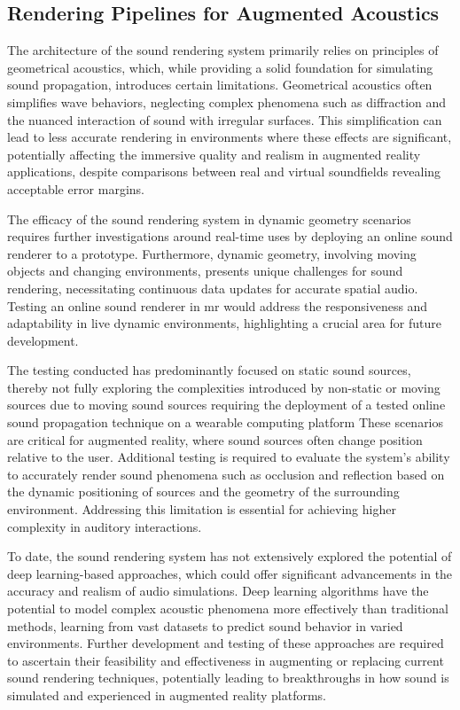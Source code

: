 \subsection{Rendering Pipelines for Augmented Acoustics}
The architecture of the sound rendering system primarily relies on principles of geometrical acoustics, which, while providing a solid foundation for simulating sound propagation, introduces certain limitations. Geometrical acoustics often simplifies wave behaviors, neglecting complex phenomena such as diffraction and the nuanced interaction of sound with irregular surfaces. This simplification can lead to less accurate rendering in environments where these effects are significant, potentially affecting the immersive quality and realism in augmented reality applications, despite comparisons between real and virtual soundfields revealing acceptable error margins.\par
The efficacy of the sound rendering system in dynamic geometry scenarios requires further investigations around real-time uses by deploying an online sound renderer to a prototype. Furthermore, dynamic geometry, involving moving objects and changing environments, presents unique challenges for sound rendering, necessitating continuous data updates for accurate spatial audio. Testing an online sound renderer in \acrshort{mr} would address the responsiveness and adaptability in live dynamic environments, highlighting a crucial area for future development.\par
The testing conducted has predominantly focused on static sound sources, thereby not fully exploring the complexities introduced by non-static or moving sources due to moving sound sources requiring the deployment of a tested online sound propagation technique on a wearable computing platform These scenarios are critical for augmented reality, where sound sources often change position relative to the user. Additional testing is required to evaluate the system's ability to accurately render sound phenomena such as occlusion and reflection based on the dynamic positioning of sources and the geometry of the surrounding environment. Addressing this limitation is essential for achieving higher complexity in auditory interactions.\par
To date, the sound rendering system has not extensively explored the potential of deep learning-based approaches, which could offer significant advancements in the accuracy and realism of audio simulations. Deep learning algorithms have the potential to model complex acoustic phenomena more effectively than traditional methods, learning from vast datasets to predict sound behavior in varied environments. Further development and testing of these approaches are required to ascertain their feasibility and effectiveness in augmenting or replacing current sound rendering techniques, potentially leading to breakthroughs in how sound is simulated and experienced in augmented reality platforms.\par

